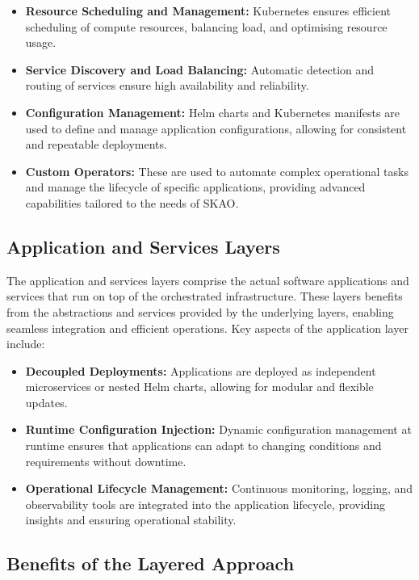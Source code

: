 \documentclass[a4paper]{spie}  %
\begin{document}
\begin{itemize}
    \item \textbf{Resource Scheduling and Management:} Kubernetes ensures efficient scheduling of compute resources, balancing load, and optimising resource usage.
    \item \textbf{Service Discovery and Load Balancing:} Automatic detection and routing of services ensure high availability and reliability.
    \item \textbf{Configuration Management:} Helm charts and Kubernetes manifests are used to define and manage application configurations, allowing for consistent and repeatable deployments.
    \item \textbf{Custom Operators:} These are used to automate complex operational tasks and manage the lifecycle of specific applications, providing advanced capabilities tailored to the needs of SKAO.
\end{itemize}

\subsection{Application and Services Layers}

The application and services layers comprise the actual software applications and services that run on top of the orchestrated infrastructure. These layers benefits from the abstractions and services provided by the underlying layers, enabling seamless integration and efficient operations. Key aspects of the application layer include:

\begin{itemize}
    \item \textbf{Decoupled Deployments:} Applications are deployed as independent microservices or nested Helm charts, allowing for modular and flexible updates.
    \item \textbf{Runtime Configuration Injection:} Dynamic configuration management at runtime ensures that applications can adapt to changing conditions and requirements without downtime.
    \item \textbf{Operational Lifecycle Management:} Continuous monitoring, logging, and observability tools are integrated into the application lifecycle, providing insights and ensuring operational stability.
\end{itemize}

\subsection{Benefits of the Layered Approach}
\end{document}
